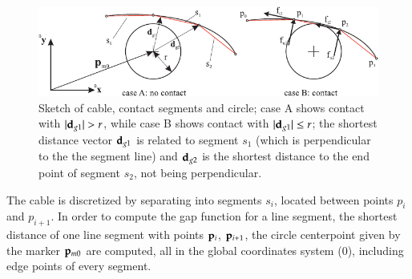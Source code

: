     \begin{figure}[tbph]
      \begin{center}
      \includegraphics[width=16cm]{figures/ContactFrictionCircleCable2D.pdf}
      \end{center}
      \caption{Sketch of cable, contact segments and circle; case A shows contact with $|\mathbf{d}_{g1}| > r$, 
               while case B shows contact with $|\mathbf{d}_{g1}| \le r$; the shortest distance vector $\mathbf{d}_{g1}$
               is related to segment $s_1$ (which is perpendicular to the the segment line) and 
               $\mathbf{d}_{g2}$ is the shortest distance to the end point of segment $s_2$, not being
               perpendicular.}
    	\label{fig:ObjectContactFrictionCircleCable2D:sketch}
    \end{figure}
    The cable is discretized by separating into segments $s_i$, located between points $p_i$ and $p_{i+1}$.
    In order to compute the gap function for a line segment, the shortest distance of one line segment with
    points $\mathbf{p}_i$, $\mathbf{p}_{i+1}$, the circle centerpoint given by the marker $\mathbf{p}_{m0}$ are computed, all in 
    the global coordinates system (0), including edge points of every segment.


